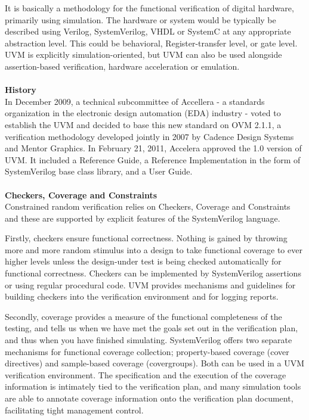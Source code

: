 \documentclass[a4paper,11pt]{article}
\begin{document}
It is basically a methodology for the functional verification of digital hardware, primarily using simulation. The hardware or system would be typically be described using Verilog, SystemVerilog, VHDL or SystemC at any appropriate abstraction level. This could be behavioral, Register-transfer level, or gate level. UVM is explicitly simulation-oriented, but UVM can also be used alongside assertion-based verification, hardware acceleration or emulation.\cite{doulos1}
\ \\
\ \\
\textbf{History}
\ \\
In December 2009, a technical subcommittee of Accellera - a standards organization in the electronic design automation (EDA) industry - voted to establish the UVM and decided to base this new standard on OVM 2.1.1, a verification methodology developed jointly in 2007 by Cadence Design Systems and Mentor Graphics.
In February 21, 2011, Accelera approved the 1.0 version of UVM. It included a Reference Guide, a Reference Implementation in the form of SystemVerilog base class library, and a User Guide.\cite{UVMWiki}
\ \\
\ \\
\textbf{Checkers, Coverage and Constraints}
\ \\
Constrained random verification relies on Checkers, Coverage and Constraints and these are supported by explicit features of the SystemVerilog language.\cite{doulos1}

Firstly, checkers ensure functional correctness. Nothing is gained by throwing more and more random stimulus into a design to take functional coverage to ever higher levels unless the design-under test is being checked automatically for functional correctness. Checkers can be implemented by SystemVerilog assertions or using regular procedural code. UVM provides mechanisms and guidelines for building checkers into the verification environment and for logging reports.\cite{doulos1}

Secondly, coverage provides a measure of the functional completeness of the testing, and tells us when we have met the goals set out in the verification plan, and thus when you have finished simulating. SystemVerilog offers two separate mechanisms for functional coverage collection; property-based coverage (cover directives) and sample-based coverage (covergroups). Both can be used in a UVM verification environment. The specification and the execution of the coverage information is intimately tied to the verification plan, and many simulation tools are able to annotate coverage information onto the verification plan document, facilitating tight management control.\cite{doulos1}
\end{document}

